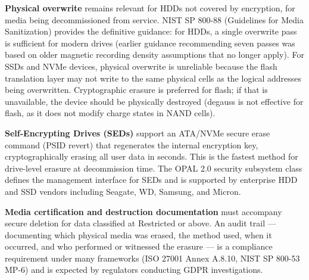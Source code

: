\textbf{Physical overwrite} remains relevant for HDDs not covered by encryption, for media being decommissioned from service. NIST SP 800-88 (Guidelines for Media Sanitization) provides the definitive guidance: for HDDs, a single overwrite pass is sufficient for modern drives (earlier guidance recommending seven passes was based on older magnetic recording density assumptions that no longer apply). For SSDs and NVMe devices, physical overwrite is unreliable because the flash translation layer may not write to the same physical cells as the logical addresses being overwritten. Cryptographic erasure is preferred for flash; if that is unavailable, the device should be physically destroyed (degauss is not effective for flash, as it does not modify charge states in NAND cells).

\textbf{Self-Encrypting Drives (SEDs)} support an ATA/NVMe secure erase command (PSID revert) that regenerates the internal encryption key, cryptographically erasing all user data in seconds. This is the fastest method for drive-level erasure at decommission time. The OPAL 2.0 security subsystem class defines the management interface for SEDs and is supported by enterprise HDD and SSD vendors including Seagate, WD, Samsung, and Micron.

\textbf{Media certification and destruction documentation} must accompany secure deletion for data classified at Restricted or above. An audit trail --- documenting which physical media was erased, the method used, when it occurred, and who performed or witnessed the erasure --- is a compliance requirement under many frameworks (ISO 27001 Annex A.8.10, NIST SP 800-53 MP-6) and is expected by regulators conducting GDPR investigations.


